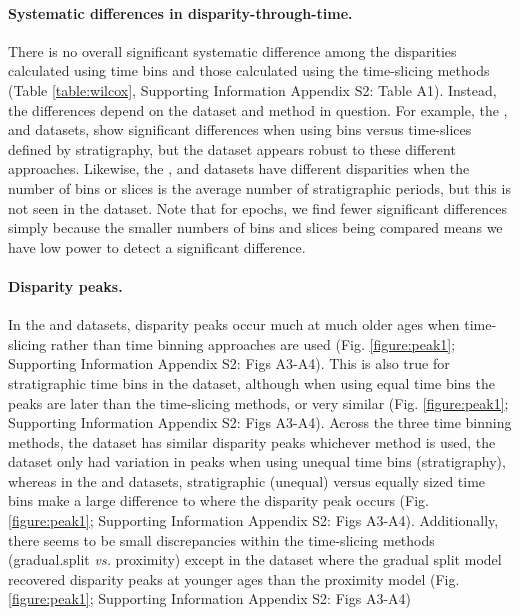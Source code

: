 \documentclass[12pt,a4paper]{article}
\begin{document}
\paragraph{Systematic differences in disparity-through-time.} 
There is no overall significant systematic difference among the disparities calculated using time bins and those calculated using the time-slicing methods (Table \ref{table:wilcox}, Supporting Information Appendix S2: Table A1).
Instead, the differences depend on the dataset and method in question.
For example, the \cite{brusatte2014gradual}, \cite{bapst2016topology} and \cite{wright2017bayesian} datasets, show significant differences when using bins versus time-slices defined by stratigraphy, but the \cite{beckancient2014} dataset appears robust to these different approaches.
Likewise, the \cite{beckancient2014}, \cite{brusatte2014gradual} and \cite{bapst2016topology} datasets have different disparities when the number of bins or slices is the average number of stratigraphic periods, but this is not seen in the \cite{wright2017bayesian} dataset.
Note that for epochs, we find fewer significant differences simply because the smaller numbers of bins and slices being compared means we have low power to detect a significant difference.

%  

\paragraph{Disparity peaks.}
In the \cite{beckancient2014} and \cite{bapst2016topology} datasets, disparity peaks occur much at much older ages when time-slicing rather than time binning approaches are used (Fig. \ref{figure:peak1}; Supporting Information Appendix S2: Figs A3-A4).
This is also true for stratigraphic time bins in the \cite{wright2017bayesian} dataset, although when using equal time bins the peaks are later than the time-slicing methods, or very similar (Fig. \ref{figure:peak1}; Supporting Information Appendix S2: Figs A3-A4).
Across the three time binning methods, the \cite{brusatte2014gradual} dataset has similar disparity peaks whichever method is used, the \cite{wright2017bayesian} dataset only had variation in peaks when using unequal time bins (stratigraphy), whereas in the \cite{bapst2016topology} and \cite{beckancient2014} datasets, stratigraphic (unequal) versus equally sized time bins make a large difference to where the disparity peak occurs (Fig. \ref{figure:peak1}; Supporting Information Appendix S2: Figs A3-A4).
Additionally, there seems to be small discrepancies within the time-slicing methods (gradual.split \textit{vs.} proximity) except in the \cite{beckancient2014} dataset where the gradual split model recovered disparity peaks at younger ages than the proximity model (Fig. \ref{figure:peak1}; Supporting Information Appendix S2: Figs A3-A4)
\end{document}
